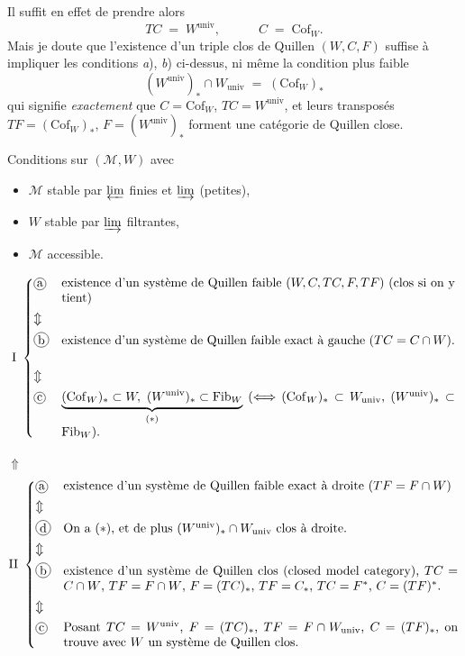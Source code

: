 \documentclass[11pt]{article}
\newcommand{\printedpage}[1]{\marginpar{\footnotesize p.~#1}}
\newcommand{\msp}[1]{\marginpar{\footnotesize [#1]}}
\newcommand{\univ}{\mathrm{univ}}
\newcommand{\Cof}{\mathrm{Cof}}
\newcommand{\Fib}{\mathrm{Fib}}
\newcommand{\cercle}[1]{\mbox{\tikz[baseline=(c.base)]\node[draw,circle,inner sep=1pt](c){#1};}}
\begin{document}
\noindent Il suffit en effet de prendre alors
\[
TC \;=\; W^{\univ}, \qquad\quad C \;=\; \Cof_W .
\]
Mais je doute que l'existence d'un triple clos de Quillen $(W, C, F)$ suffise à impliquer les conditions \textit{a}), \textit{b}) ci-dessus, ni même la condition plus faible
\[
(W^{\univ})_* \cap W_{\univ} \;=\; (\Cof_W)_*
\]
qui signifie \textit{exactement} que $C = \Cof_W$, $TC = W^{\univ}$, et leurs transposés $TF = (\Cof_W)_*$, $F = (W^{\univ})_*$ forment une catégorie de Quillen close.

\clearpage
\printedpage{15}

\msp{page 26}
\noindent Conditions sur $(\mathcal{M}, W)$ avec
\begin{itemize}[leftmargin=3em]
\item[\textit{a})] $\mathcal{M}$ stable par $\varprojlim$ finies et $\varinjlim$ (petites),
\item[\textit{b})] $W$ stable par $\varinjlim$ filtrantes,
\item[\textit{c})] $\mathcal{M}$ accessible.
\end{itemize}

\[
\mathrm{I}\ \left\{
\begin{array}{@{}l@{\quad}p{11cm}@{}}
\cercle{a} & existence d'un système de Quillen faible $(W, C, TC, F, TF)$ (clos si on y tient) \\[1ex]
\Updownarrow & \\[1ex]
\cercle{b} & existence d'un système de Quillen faible exact à gauche ($TC = C \cap W$). \\[1ex]
\Updownarrow & \\[1ex]
\cercle{c} & $\underbrace{(\Cof_W)_* \subset W,\ (W^{\univ})_* \subset \Fib_W}_{(*)}$ ($\Longleftrightarrow$ $(\Cof_W)_* \subset W_{\univ}$, $(W^{\univ})_* \subset \Fib_W$).
\end{array}\right.
\]

\noindent$\Uparrow$
\[
\mathrm{II}\ \left\{
\begin{array}{@{}l@{\quad}p{11cm}@{}}
\cercle{a} & existence d'un système de Quillen faible exact à droite ($TF = F \cap W$) \\[1ex]
\Updownarrow & \\[1ex]
\cercle{d} & On a $(*)$, et de plus $(W^{\univ})_* \cap W_{\univ}$ clos à droite. \\[1ex]
\Updownarrow & \\[1ex]
\cercle{b} & existence d'un système de Quillen clos (closed model category), $TC = C \cap W$, $TF = F \cap W$, $F = (TC)_*$, $TF = C_*$, $TC = F^*$, $C = (TF)^*$. \\[1ex]
\Updownarrow & \\[1ex]
\cercle{c} & Posant $TC = W^{\univ}$, $F = (TC)_*$, $TF = F \cap W_{\univ}$, $C = (TF)_*$, on trouve avec $W$ un système de Quillen clos. %
\end{array}\right.
\]
\end{document}

